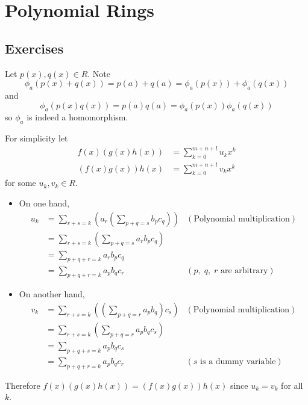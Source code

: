 \section{Polynomial Rings}
\subsection*{Exercises}
\begin{questions}
    \item Let $p(x), q(x) \in R$. Note
    \[
        \phi_a(p(x)+q(x)) = p(a) + q(a) = \phi_a(p(x)) + \phi_a(q(x))
    \]
    and
    \[
        \phi_a(p(x)q(x)) = p(a)q(a) = \phi_a(p(x))\phi_a(q(x))
    \]
    so $\phi_a$ is indeed a homomorphism.

    \item For simplicity let
    \begin{align*}
        f(x)(g(x)h(x)) &= \sum_{k=0}^{m+n+l}u_kx^k\\
        (f(x)g(x))h(x) &= \sum_{k=0}^{m+n+l}v_kx^k
    \end{align*}
    for some $u_k, v_k \in R$.
    \begin{itemize}
        \item On one hand,
        \begin{align*}
            u_k &= \sum_{r+s=k}\left(a_r\left(\sum_{p+q=s}b_pc_q\right)\right) & (\text{Polynomial multiplication})\\
            &= \sum_{r+s=k}\left(\sum_{p+q=s}a_rb_pc_q\right)\\
            &= \sum_{p+q+r=k}a_rb_pc_q\\
            &= \sum_{p+q+r=k}a_pb_qc_r & (p,\;q,\;r \text{ are arbitrary})
        \end{align*}

        \item On another hand,
        \begin{align*}
            v_k &= \sum_{r+s=k}\left(\left(\sum_{p+q=r}a_pb_q\right)c_s\right) & (\text{Polynomial multiplication})\\
            &= \sum_{r+s=k}\left(\sum_{p+q=r}a_pb_qc_s\right)\\
            &= \sum_{p+q+s=k}a_pb_qc_s\\
            &= \sum_{p+q+r=k}a_pb_qc_r & (s\text{ is a dummy variable})
        \end{align*}
    \end{itemize}
    Therefore $f(x)(g(x)h(x)) = (f(x)g(x))h(x)$ since $u_k = v_k$ for all $k$.


\end{questions}
